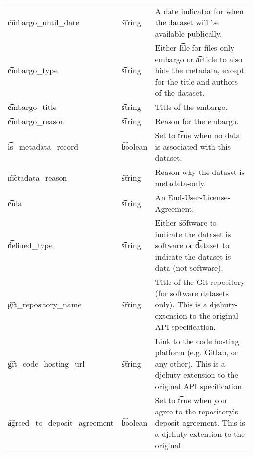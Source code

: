 \begin{tabularx}{\textwidth}{*{2}{!{\VRule[-1pt]}l}!{\VRule[-1pt]}X}
  \t{embargo\_until\_date} & \t{string}     & A date indicator for when the
                                              dataset will be available
                                              publically.\\
  \t{embargo\_type}  & \t{string}           & Either \t{file} for files-only
                                              embargo or \t{article} to also
                                              hide the metadata, except for the
                                              title and authors of the dataset.\\
  \t{embargo\_title} & \t{string}           & Title of the embargo.\\
  \t{embargo\_reason} & \t{string}          & Reason for the embargo.\\
  \t{is\_metadata\_record} & \t{boolean}    & Set to \t{true} when no data is
                                              associated with this dataset.\\
  \t{metadata\_reason} & \t{string}         & Reason why the dataset is
                                              metadata-only.\\
  \t{eula}           & \t{string}           & An End-User-License-Agreement.\\
  \t{defined\_type}  & \t{string}           & Either \t{software} to indicate
                                              the dataset is software or
                                              \t{dataset} to indicate the
                                              dataset is data (not software).\\
  \t{git\_repository\_name} & \t{string}    & Title of the Git repository (for
                                              software datasets only).  This is
                                              a djehuty-extension to the
                                              original API specification.\\
  \t{git\_code\_hosting\_url} & \t{string}  & Link to the code hosting platform
                                              (e.g. Gitlab, or any other).  This
                                              is a djehuty-extension to the
                                              original API specification.\\
  \t{agreed\_to\_deposit\_agreement} & \t{boolean} & Set to \t{true} when you
                                              agree to the repository's deposit
                                              agreement.  This is a
                                              djehuty-extension to the original

\end{tabularx}
